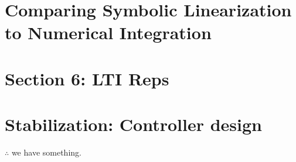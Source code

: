 \documentclass[10pt]{article}
\begin{document}
\section{Comparing Symbolic Linearization to Numerical Integration}

\section{Section 6: LTI Reps}


\section{Stabilization: Controller design}

$\therefore$ we have something.
\mixedcls
\end{document}
